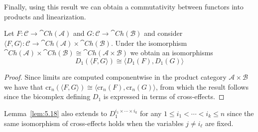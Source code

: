 Finally, using this result we can obtain a commutativity between functors into products and linearization.

\begin{lem}[label=lem:5.18]
    Let $F:\mathcal{C}\to \cat{Ch}(\mathcal{A})$ and $G:\mathcal{C}\to \cat{Ch}(\mathcal{B})$ and consider $\langle F,G\rangle:\mathcal{C}\to \cat{Ch}(\mathcal{A})\times \cat{Ch}(\mathcal{B})$. Under the isomorphism $\cat{Ch}(\mathcal{A})\times \cat{Ch}(\mathcal{B}) \cong \cat{Ch}(\mathcal{A}\times \mathcal{B})$ we obtain an isomorphisms
    \begin{equation*}
        D_1(\langle F,G\rangle) \cong \langle D_1(F),D_1(G)\rangle
    \end{equation*}
\end{lem}
\begin{proof}
    Since limits are computed componentwise in the product category $\mathcal{A}\times \mathcal{B}$ we have that $\text{cr}_n(\langle F,G\rangle) \cong \langle \text{cr}_n(F),\text{cr}_n(G)\rangle$, from which the result follows since the bicomplex defining $D_1$ is expressed in terms of cross-effects.
\end{proof}

Lemma~\ref{lem:5.18} also extends to $D_1^{i_1\times \cdots \times i_k}$ for any $1 \leq i_1 < \cdots < i_k\leq n$ since the same isomorphism of cross-effects holds when the variables $j \neq i_\ell$ are fixed.